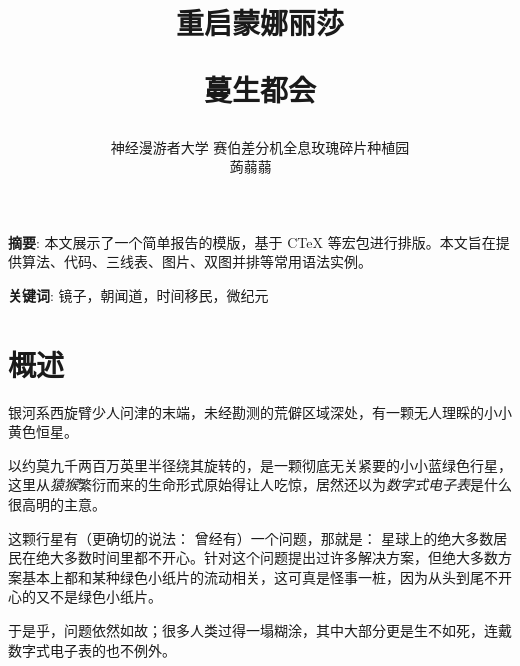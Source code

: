 \documentclass[12]{ctexart}
\begin{document}

\title{
    重启蒙娜丽莎\bigskip\par
    蔓生都会
}
\author{
    神经漫游者大学 \qquad 赛伯差分机全息玫瑰碎片种植园\\
    蒟蒻蒻  \ \ \quad
}

\makeatletter
\renewcommand{\maketitle}{
    \begin{center}
        {\heiti\fontsize{15pt}{\baselineskip}\bfseries\@title}%
        \bigskip\par\noindent
        {\songti\normalsize\@author}%
        \bigskip\par\noindent
    \end{center}
}
\makeatother

\maketitle


{\noindent\bfseries{摘要}}:
本文展示了一个简单报告的模版，基于 CTeX \cite{ctex}等宏包进行排版。本文旨在提供算法、代码、三线表、图片、双图并排等常用语法实例。

{\noindent\bfseries{关键词}}:
镜子，朝闻道，时间移民，微纪元



\section{概述}

银河系西旋臂少人问津的末端，未经勘测的荒僻区域深处，有一颗无人理睬的小小黄色恒星。

以约莫九千两百万英里半径绕其旋转的，是一颗彻底无关紧要的小小蓝绿色行星，这里从\emph{猿猴}繁衍而来的生命形式原始得让人吃惊，居然还以为\emph{数字式电子表}是什么很高明的主意。

这颗行星有（更确切的说法： 曾经有）一个问题，那就是： 星球上的绝大多数居民在绝大多数时间里都不开心。针对这个问题提出过许多解决方案，但绝大多数方案基本上都和某种绿色小纸片的流动相关，这可真是怪事一桩，因为从头到尾不开心的又不是绿色小纸片。

于是乎，问题依然如故；很多人类过得一塌糊涂，其中大部分更是生不如死，连戴数字式电子表的也不例外。
\end{document}
